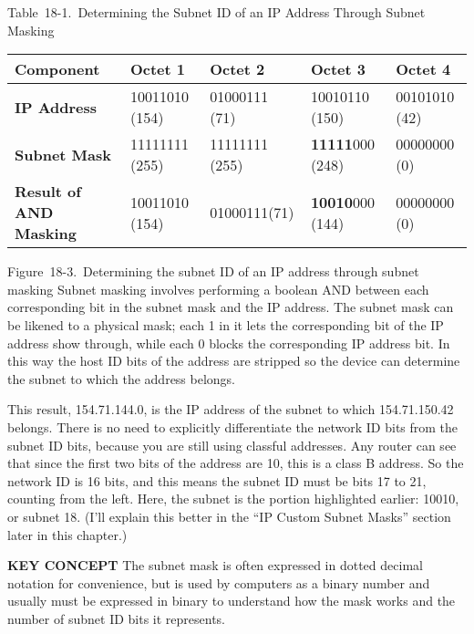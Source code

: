 Table~18-1.~Determining the Subnet ID of an IP Address Through Subnet
Masking

\begin{longtable}[]{@{}lllll@{}}
\toprule
Component & Octet 1 & Octet 2 & Octet 3 & Octet 4\tabularnewline
\midrule
\endhead
{\textbf{IP Address}} & 10011010 (154) & 01000111 (71) & 10010110 (150)
& 00101010 (42)\tabularnewline
{\textbf{Subnet Mask}} & 11111111 (255) & 11111111 (255) &
{\textbf{11111}}000 (248) & 00000000 (0)\tabularnewline
{\textbf{Result of AND Masking}} & 10011010 (154) & 01000111(71) &
{\textbf{10010}}000 (144) & 00000000 (0)\tabularnewline
\bottomrule
\end{longtable}

\protect\hypertarget{ch18s03.htmlux5cux23determining_the_subnet_id_of_an_ip-id001}{}{}

\protect\hypertarget{ch18s03.htmlux5cux23I_mediaobject4_d1e18373}{}{}

Figure~18-3.~Determining the subnet ID of an IP address through subnet
masking Subnet masking involves performing a boolean AND between each
corresponding bit in the subnet mask and the IP address. The subnet mask
can be likened to a physical mask; each 1 in it lets the corresponding
bit of the IP address show through, while each 0 blocks the
corresponding IP address bit. In this way the host ID bits of the
address are stripped so the device can determine the subnet to which the
address belongs.

This result, 154.71.144.0, is the IP address of the subnet to which
154.71.150.42 belongs. There is no need to explicitly differentiate the
network \protect\hypertarget{ch18s03.htmlux5cux23idx-CHP-18-0726}{}{}ID
bits from the subnet ID bits, because you are still using classful
addresses. Any router can see that since the first two bits of the
address are 10, this is a class B address. So the network ID is 16 bits,
and this means the subnet ID must be bits 17 to 21, counting from the
left. Here, the subnet is the portion highlighted earlier: 10010, or
subnet 18. (I'll explain this better in the ``IP Custom Subnet Masks''
section later in this chapter.)


{\textbf{KEY CONCEPT}} The subnet mask is often expressed in dotted
decimal notation for convenience, but is used by computers as a binary
number and usually must be expressed in binary to understand how the
mask works and the number of subnet ID bits it represents.



